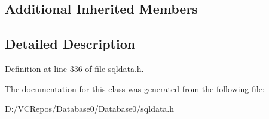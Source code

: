 \subsection*{Additional Inherited Members}


\subsection{Detailed Description}


Definition at line 336 of file sqldata.\+h.



The documentation for this class was generated from the following file\+:\begin{DoxyCompactItemize}
\item 
D\+:/\+V\+C\+Repos/\+Database0/\+Database0/sqldata.\+h\end{DoxyCompactItemize}
